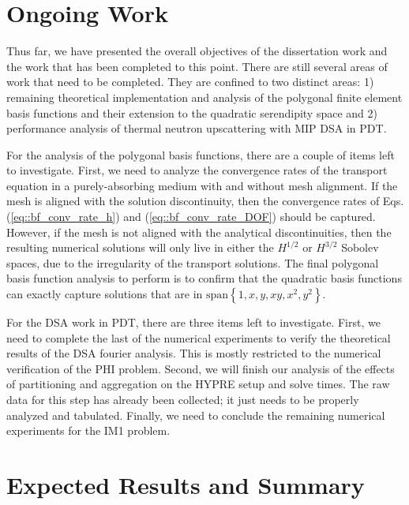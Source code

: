 \documentclass[11pt]{article}
\begin{document}
\section{Ongoing Work}
\label{sec::OW}

Thus far, we have presented the overall objectives of the dissertation work and the work that has been completed to this point. There are still several areas of work that need to be completed. They are confined to two distinct areas: 1) remaining theoretical implementation and analysis of the polygonal finite element basis functions and their extension to the quadratic serendipity space and 2) performance analysis of thermal neutron upscattering with  MIP DSA in PDT.

For the analysis of the polygonal basis functions, there are a couple of items left to investigate. First, we need to analyze the convergence rates of the transport equation in a purely-absorbing medium with and without mesh alignment. If the mesh is aligned with the solution discontinuity, then the convergence rates of Eqs. (\ref{eq::bf_conv_rate_h}) and (\ref{eq::bf_conv_rate_DOF}) should be captured. However, if the mesh is not aligned with the analytical discontinuities, then the resulting numerical solutions will only live in either the $H^{1/2}$ or $H^{3/2}$ Sobolev spaces, due to the irregularity of the transport solutions. The final polygonal basis function analysis to perform is to confirm that the quadratic basis functions can exactly capture solutions that are in $\text{span}\left\{  1,x,y,xy,x^2,y^2  \right\}$.

For the DSA work in PDT, there are three items left to investigate. First, we need to complete the last of the numerical experiments to verify the theoretical results of the DSA fourier analysis. This is mostly restricted to the numerical verification of the PHI problem. Second, we will finish our analysis of the effects of partitioning and aggregation on the HYPRE setup and solve times. The raw data for this step has already been collected; it just needs to be properly analyzed and tabulated. Finally, we need to conclude the remaining numerical experiments for the IM1 problem.

\section{Expected Results and Summary}
\label{sec::ER}
\end{document}
